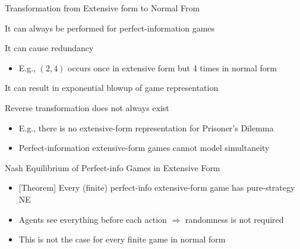 \documentclass[11pt,aspectratio=169,handout]{beamer}
\begin{document}
  \begin{frame}{Transformation from Extensive form to Normal From}
   \begin{itemizes}
    \item It can \alert{always} be performed for perfect-information games
    \item It can cause redundancy
    \begin{itemize}
     \item E.g., $(2, 4)$ occurs once in extensive form but 4 times in normal form
    \end{itemize}
    \item It can result in \alert{exponential blowup} of game representation
    \item Reverse transformation does not always exist
    \begin{itemize}
     \item E.g., there is \alert{no} extensive-form representation for Prisoner's Dilemma
     \item Perfect-information extensive-form games cannot model \alert{simultaneity}
    \end{itemize}
   \end{itemizes}
  \end{frame}

 
  \begin{frame}{Nash Equilibrium of Perfect-info Games in Extensive Form}
   \begin{itemize}
   \setlength{\itemsep}{1.5em}
    \item \alert{[Theorem]} Every (finite) perfect-info extensive-form game has \alert{pure-strategy} NE
    \item Agents see everything before each action $\Rightarrow$ randomness is not required
    \item This is not the case for every finite game in normal form
   \end{itemize}
  \end{frame}
  
\end{document}
